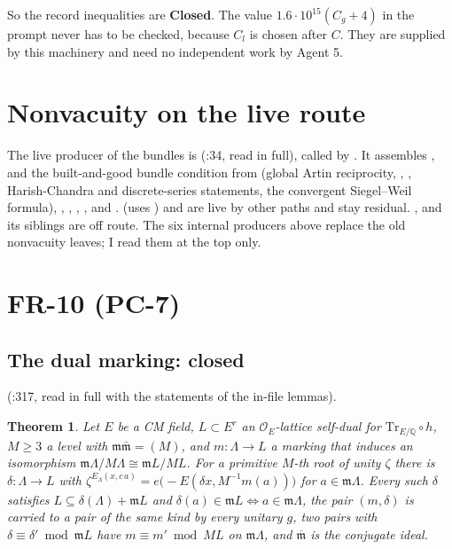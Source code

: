 \documentclass[11pt]{article}
\newcommand{\FR}[1]{\textsf{FR-#1}}
\newcommand{\PC}[1]{\textsf{PC-#1}}
\newcommand{\sC}{\textbf{Closed}}
\newtheorem{theorem}{Theorem}
\theoremstyle{remark}
\begin{document}
So the record inequalities are \sC. The value $1.6\cdot10^{15}(C_g+4)$ in the prompt never has to be checked, because $C_l$ is chosen after $C$. They are supplied by this machinery and need no independent work by Agent 5.

\section{Nonvacuity on the live route}\label{sec:nonvac}

The live producer of the bundles is  (:34, read in full), called by . It assembles ,  and the built-and-good bundle condition from  (global Artin reciprocity, , , Harish-Chandra and discrete-series statements, the convergent Siegel--Weil formula), , , , ,  and .  (uses ) and  are live by other paths and stay residual. ,  and its siblings are off route. The six internal producers above replace the old nonvacuity leaves; I read them at the top only.

\section{\FR{10} (\PC{7})}

\subsection{The dual marking: closed}

 (:317, read in full with the statements of the in-file lemmas).

\begin{theorem}
Let $E$ be a CM field, $L\subset E^r$ an $\mathcal O_E$-lattice self-dual for $\mathrm{Tr}_{E/\mathbb Q}\circ h$, $M\ge3$ a level with $\mathfrak m\bar{\mathfrak m}=(M)$, and $m\colon\Lambda\to L$ a marking that induces an isomorphism $\mathfrak m\Lambda/M\Lambda\cong\mathfrak mL/ML$. For a primitive $M$-th root of unity $\zeta$ there is $\delta\colon\Lambda\to L$ with $\zeta^{E_\Lambda(x,c\,a)}=e\bigl(-E(\delta x,M^{-1}m(a))\bigr)$ for $a\in\mathfrak m\Lambda$. Every such $\delta$ satisfies $L\subseteq\delta(\Lambda)+\mathfrak mL$ and $\delta(a)\in\mathfrak mL\iff a\in\mathfrak m\Lambda$, the pair $(m,\delta)$ is carried to a pair of the same kind by every unitary $g$, two pairs with $\delta\equiv\delta'\bmod\mathfrak mL$ have $m\equiv m'\bmod ML$ on $\mathfrak m\Lambda$, and $\overline{\mathfrak m}$ is the conjugate ideal.
\end{theorem}
\end{document}
